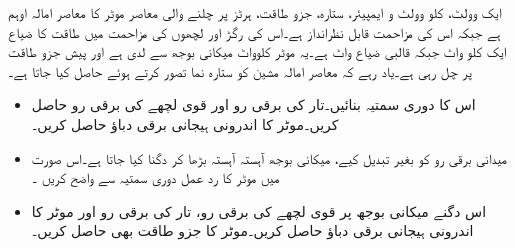 %
ایک  وولٹ،  کلو وولٹ و ایمپیئر، ستارہ،  جزو طاقت،  ہرٹز پر چلنے والی معاصر موٹر کا معاصر امالہ  اوہم  ہے جبکہ اس کی مزاحمت قابل نظرانداز ہے۔اس کی رگڑ اور لچھوں کی مزاحمت میں طاقت کا ضیاع ایک کلو واٹ جبکہ قالبی ضیاع  واٹ ہے۔یہ موٹر   کلوواٹ میکانی بوجھ سے لدی  ہے اور    پیش جزو طاقت   پر چل رہی ہے۔یاد رہے کہ معاصر امالہ مشین کو ستارہ نما تصور کرتے ہوئے حاصل کیا جاتا ہے۔ 
\begin{itemize}
\item
اس کا دوری سمتیہ بنائیں۔تار کی  برقی رو  اور قوی لچھے کی  برقی رو   حاصل کریں۔موٹر کا اندرونی ہیجانی برقی دباؤ  حاصل کریں۔
\item
میدانی برقی رو کو بغیر تبدیل کیے،  میکانی بوجھ آہستہ آہستہ بڑھا کر دگنا کیا جاتا ہے۔اس صورت میں موٹر کا رد عمل دوری سمتیہ سے واضح کریں ۔
\item
اس دگنے میکانی بوجھ پر قوی لچھے  کی برقی رو،  تار کی برقی رو  اور موٹر کا اندرونی ہیجانی برقی دباؤ حاصل کریں۔موٹر کا جزو طاقت بھی حاصل کریں۔
\end{itemize}

